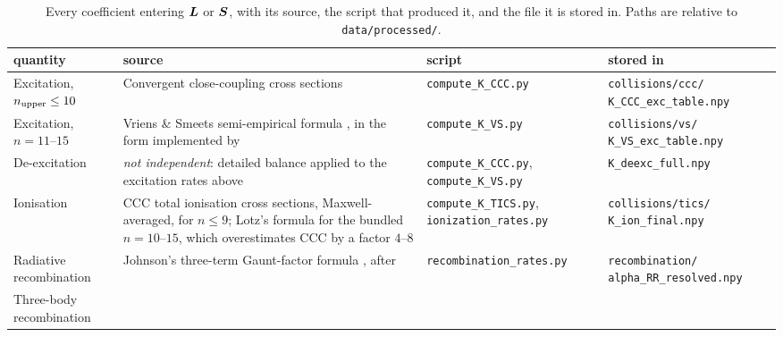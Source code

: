 \begin{table}[htbp]
  \centering
  \caption[Provenance of every rate in the matrix]{Every coefficient entering
    $\bm{L}$ or $\bm{S}$, with its source, the script that produced it, and the
    file it is stored in. Paths are relative to \texttt{data/processed/}.}
  \label{tab:data_provenance}
  \small
  \begin{tabular}{@{}p{2.6cm}p{3.5cm}p{3.2cm}p{4.3cm}@{}}
    \toprule
    quantity & source & script & stored in \\
    \midrule
    Excitation, \newline $n_{\rm upper} \le 10$
      & Convergent close-coupling cross sections
        \cite{BrayStelbovics1992,Bray2002}
      & \texttt{compute\_K\_CCC.py}
      & \texttt{collisions/ccc/} \newline \texttt{K\_CCC\_exc\_table.npy} \\
    \addlinespace
    Excitation, \newline $n = 11$--$15$
      & Vriens \& Smeets semi-empirical formula
        \cite{VriensSmeets1980}, in the form implemented by
        \cite{Hartgers2001}
      & \texttt{compute\_K\_VS.py}
      & \texttt{collisions/vs/} \newline \texttt{K\_VS\_exc\_table.npy} \\
    \addlinespace
    De-excitation
      & \emph{not independent}: detailed balance applied to the excitation
        rates above
      & \texttt{compute\_K\_CCC.py}, \newline \texttt{compute\_K\_VS.py}
      & \texttt{K\_deexc\_full.npy} \\
    \addlinespace
    Ionisation
      & CCC total ionisation cross sections, Maxwell-averaged, for
        $n \le 9$; Lotz's formula \cite{Lotz1968} for the bundled
        $n = 10$--$15$, which overestimates CCC by a factor $4$--$8$
      & \texttt{compute\_K\_TICS.py}, \newline \texttt{ionization\_rates.py}
      & \texttt{collisions/tics/} \newline \texttt{K\_ion\_final.npy} \\
    \addlinespace
    Radiative \newline recombination
      & Johnson's three-term Gaunt-factor formula \cite{Johnson1972},
        after \cite{Seaton1959}
      & \texttt{recombination\_rates.py}
      & \texttt{recombination/} \newline \texttt{alpha\_RR\_resolved.npy} \\
    \addlinespace
    Three-body \newline recombination

\end{tabular}
\end{table}

